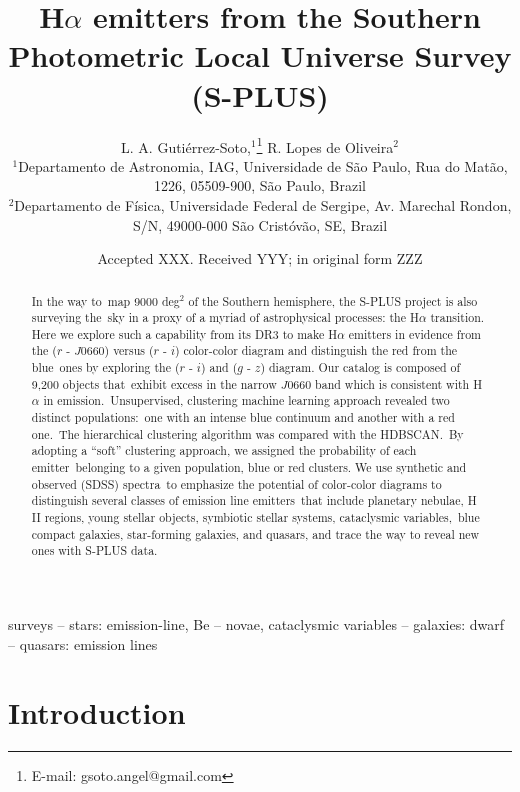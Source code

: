 \documentclass[fleqn,usenatbib]{mnras}
\title[S-PLUS: H$\alpha$ emitters]{H$\alpha$ emitters from the Southern Photometric Local Universe Survey (S-PLUS)}
\author[Guti\'{e}rrez-Soto et al.]{
L. A. Guti\'{e}rrez-Soto,$^{1}$\thanks{E-mail: gsoto.angel@gmail.com}
R. Lopes de Oliveira$^{2}$
\\
$^{1}$Departamento de Astronomia, IAG, Universidade de S\~{a}o Paulo, Rua do Mat\~{a}o,
1226, 05509-900, S\~{a}o Paulo, Brazil\\
$^{2}$Departamento de Física, Universidade Federal de Sergipe, Av. Marechal Rondon, S/N, 49000-000 São Cristóvão, SE, Brazil
}
\date{Accepted XXX. Received YYY; in original form ZZZ}
\begin{document}
\label{firstpage}
\pagerange{\pageref{firstpage}--\pageref{lastpage}}
\maketitle

\begin{abstract}

In the way to map 9000 deg$^2$ of the Southern hemisphere, the S-PLUS project is also surveying the sky in a proxy of a myriad of astrophysical processes: the H$\alpha$ transition. Here we explore such a capability from its DR3 to make H$\alpha$ emitters in evidence from 
the ($r$ - $J$0660) versus ($r$ - $i$) color-color diagram and distinguish the red from the blue ones by exploring the ($r$ - $i$) and ($g$ - $z$) diagram. Our catalog is composed of 9,200 objects that exhibit excess in the narrow $J$0660 band which is consistent with H{$\alpha$} in emission. Unsupervised, clustering machine learning approach revealed two distinct populations: one with an intense blue continuum and another with a red one. The hierarchical clustering algorithm was compared with the HDBSCAN. By adopting a ``soft'' clustering approach, we assigned the probability of each emitter belonging to a given population, blue or red clusters. We use synthetic and observed (SDSS) spectra to emphasize the potential of color-color diagrams to distinguish several classes of emission line emitters that include planetary nebulae, H II regions, young stellar objects, symbiotic stellar systems, cataclysmic variables, blue compact galaxies, star-forming galaxies, and quasars, and trace the way to reveal new ones with S-PLUS data.

\end{abstract}
\begin{keywords}
  surveys -- stars: emission-line, Be -- novae, cataclysmic variables
  -- galaxies: dwarf -- quasars: emission lines
\end{keywords}



\section{Introduction}
\end{document}
